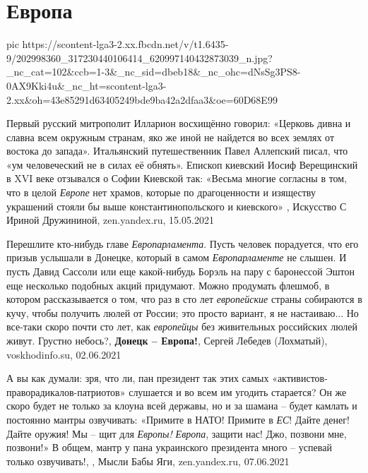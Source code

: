  
 
 
 
 
\chapter{Европа}
\label{sec:slova.evropa}

\ifcmt
  pic https://scontent-lga3-2.xx.fbcdn.net/v/t1.6435-9/202998360_317230440106414_620997140432873039_n.jpg?_nc_cat=102&ccb=1-3&_nc_sid=dbeb18&_nc_ohc=dNsSg3PS8-0AX9Kki4u&_nc_ht=scontent-lga3-2.xx&oh=43e85291d63405249bde9ba42a2dfaa3&oe=60D68E99
\fi

Первый русский митрополит Илларион восхищённо говорил: «Церковь дивна и славна
всем окружным странам, яко же иной не найдется во всех землях от востока до
запада».  Итальянский путешественник Павел Аллепский писал, что «ум
человеческий не в силах её обнять».  Епископ киевский Иосиф Верещинский в XVI
веке отзывался о Софии Киевской так: «Весьма многие согласны в том, что в целой
\emph{Европе} нет храмов, которые по драгоценности и изяществу украшений стояли бы
выше константинопольского и киевского»
, 
Искусство С Ириной Дружининой, zen.yandex.ru, 15.05.2021

Перешлите кто-нибудь главе \emph{Европарламента}. Пусть человек порадуется, что
его призыв услышали в Донецке, который в самом \emph{Европарламенте} не слышен.
И пусть Давид Сассоли или еще какой-нибудь Борэль на пару с баронессой Эштон
еще несколько подобных акций придумают.  Можно продумать флешмоб, в котором
рассказывается о том, что раз в сто лет \emph{европейские} страны собираются в
кучу, чтобы получить люлей от России; это просто вариант, я не настаиваю... Но
все-таки скоро почти сто лет, как \emph{европейцы} без живительных российских
люлей живут.  Грустно небось?, 
\textbf{Донецк – Европа!}, Сергей Лебедев (Лохматый), voskhodinfo.su, 02.06.2021

А вы как думали: зря, что ли, пан президент так этих самых
«активистов-праворадикалов-патриотов» слушается и во всем им угодить старается?
Он же скоро будет не только за клоуна всей державы, но и за шамана – будет
камлать и постоянно мантры озвучивать: «Примите в НАТО! Примите в \emph{ЕС}!
Дайте денег! Дайте оружия! Мы – щит для \emph{Европы!} \emph{Европа}, защити
нас! Джо, позвони мне, позвони!» В общем, мантр у пана украинского президента
много – успевай только озвучивать!,
, Мысли Бабы Яги, zen.yandex.ru, 07.06.2021

